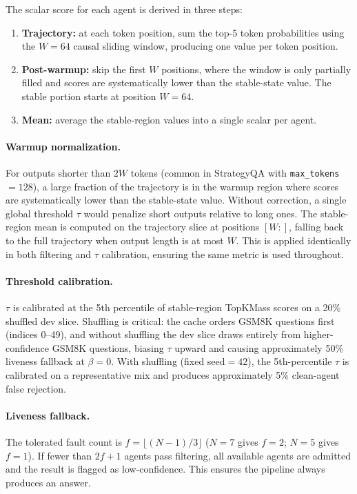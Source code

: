 \documentclass[11pt]{article}
\begin{document}
The scalar score for each agent is derived in three steps:
\begin{enumerate}[leftmargin=*, itemsep=2pt]
  \item \textbf{Trajectory:} at each token position, sum the top-5 token
        probabilities using the $W=64$ causal sliding window, producing one
        value per token position.
  \item \textbf{Post-warmup:} skip the first $W$ positions, where the window
        is only partially filled and scores are systematically lower than the
        stable-state value. The stable portion starts at position $W=64$.
  \item \textbf{Mean:} average the stable-region values into a single scalar
        per agent.
\end{enumerate}

\paragraph{Warmup normalization.}
For outputs shorter than $2W$ tokens (common in StrategyQA with
\texttt{max\_tokens}$=128$), a large fraction of the trajectory is in the warmup
region where scores are systematically lower than the stable-state value.
Without correction, a single global threshold $\tau$ would penalize short
outputs relative to long ones. The stable-region mean is computed on the
trajectory slice at positions $[W{:}]$, falling back to the full trajectory when
output length is at most $W$. This is applied identically in both filtering and
$\tau$ calibration, ensuring the same metric is used throughout.

\paragraph{Threshold calibration.}
$\tau$ is calibrated at the 5th percentile of stable-region TopKMass scores on
a 20\% shuffled dev slice. Shuffling is critical: the cache orders GSM8K
questions first (indices 0--49), and without shuffling the dev slice draws
entirely from higher-confidence GSM8K questions, biasing $\tau$ upward and
causing approximately 50\% liveness fallback at $\beta=0$. With shuffling (fixed
seed$=42$), the 5th-percentile $\tau$ is calibrated on a representative mix and
produces approximately 5\% clean-agent false rejection.

\paragraph{Liveness fallback.}
The tolerated fault count is $f = \lfloor(N-1)/3\rfloor$ ($N=7$ gives $f=2$;
$N=5$ gives $f=1$). If fewer than $2f+1$ agents pass filtering, all available
agents are admitted and the result is flagged as low-confidence. This ensures the
pipeline always produces an answer.
\end{document}
